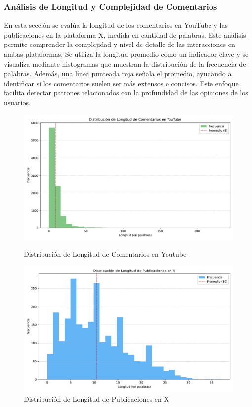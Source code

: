 \documentclass[10pt, a4paper]{article}
\begin{document}
	\subsubsection{Análisis de Longitud y Complejidad de Comentarios}
	En esta sección se evalúa la longitud de los comentarios en YouTube y las publicaciones en la plataforma X, medida en cantidad de palabras. Este análisis permite comprender la complejidad y nivel de detalle de las interacciones en ambas plataformas. Se utiliza la longitud promedio como un indicador clave y se visualiza mediante histogramas que muestran la distribución de la frecuencia de palabras. Además, una línea punteada roja señala el promedio, ayudando a identificar si los comentarios suelen ser más extensos o concisos. Este enfoque facilita detectar patrones relacionados con la profundidad de las opiniones de los usuarios.
	
	\begin{figure}[h!]
		\centering
		\begin{minipage}{0.49\textwidth} %
			\includegraphics[width=\linewidth]{longitud_comentarios_youtube.pdf} 
			\vspace{-2mm}
			\caption{Distribución de Longitud de Comentarios en Youtube}
			\label{fig:longYoutube}
		\end{minipage}
		\hfill %
		\begin{minipage}{0.49\textwidth}
			\includegraphics[width=\linewidth]{longitud_publicaciones_x.pdf}
			\vspace{-2mm}
			\caption{Distribución de Longitud de Publicaciones en X}
			\label{fig:longX}
		\end{minipage}
	\end{figure}
	
\end{document}
